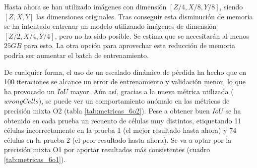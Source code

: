 Hasta ahora se han utilizado imágenes con dimensión $[Z/4, X/8, Y/8]$, siendo $[Z, X, Y]$ las dimensiones originales. Tras conseguir esta disminución de memoria se ha intentado entrenar un modelo utilizando imágenes de dimensión $[Z/2, X/4, Y/4]$, pero no ha sido posible. Se estima que se necesitarán al menos $25GB$ para esto. La otra opción para aprovechar esta reducción de memoria podría ser aumentar el batch de entrenamiento.

De cualquier forma, el uso de un escalado dinámico de pérdida ha hecho que en 100 iteraciones se alcance un error de entrenamiento y validación menor, lo que ha provocado un $IoU$ mayor. Aún así, gracias a la nueva métrica utilizada ($wrongCells$), se puede ver un comportamiento anómalo en las métricas de precisión mixta O2 (tabla \ref{tab:metricas_6o2}). Pese a obtener buen $IoU$ se ha obtenido en cada prueba un recuento de células muy distintos, etiquetando 11 células incorrectamente en la prueba 1 (el mejor resultado hasta ahora) y 74 células en la prueba 2 (el peor resultado hasta ahora). Se va a optar por la precisión mixta O1 por aportar resultados más consistentes (cuadro \ref{tab:metricas_6o1}).